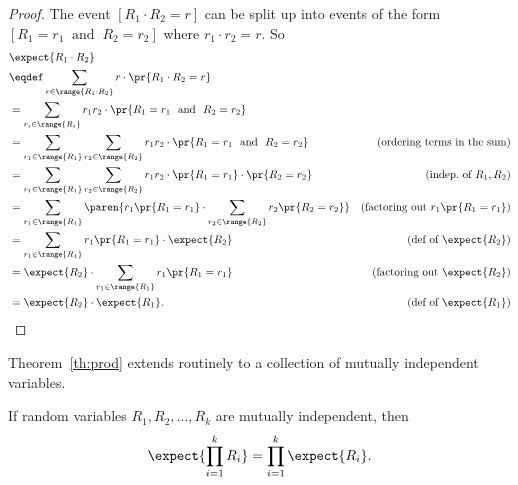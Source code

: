 \begin{proof}
The event $[R_1 \cdot R_2=r]$ can be split up into events of the form
$[R_1 = r_1\ \text{ and }\ R_2 = r_2]$ where $r_1\cdot r_2=r$.  So
\begin{align*}
\lefteqn{\expect{R_1 \cdot R_2}}\\
& \eqdef \sum_{r \in \range{R_1\cdot R_2}} r\cdot \pr{R_1\cdot R_2=r}\\
\iffalse
& =      \sum_{\scriptsize \begin{aligned}
                       r_1 \in \range{R_1},\\
                       r_2 \in \range{R_2}
                      \end{aligned}}\fi
& =      \sum_{r_i \in \range{R_i}}
            r_1 r_2 \cdot \pr{R_1=r_1\ \text{ and }\ R_2=r_2}\\
& =      \sum_{r_1 \in \range{R_1}} \sum_{r_2 \in \range{R_2}}
            r_1 r_2 \cdot \pr{R_1=r_1\ \text{ and }\ R_2=r_2}
                    &\text{(ordering terms in the sum)}\\
& =      \sum_{r_1 \in \range{R_1}} \sum_{r_2 \in \range{R_2}}
            r_1 r_2 \cdot \pr{R_1=r_1}\cdot \pr{R_2=r_2}
                    &\text{(indep.\ of $R_1,R_2$)}\\
& =      \sum_{r_1 \in \range{R_1}} \paren{r_1\pr{R_1=r_1} \cdot
              \sum_{r_2 \in \range{R_2}} r_2 \pr{R_2=r_2}}
                    &\text{(factoring out $r_1\pr{R_1=r_1}$)}\\
& =      \sum_{r_1 \in \range{R_1}} r_1\pr{R_1=r_1} \cdot \expect{R_2}
                    &\text{(def of $\expect{R_2}$)}\\
& =       \expect{R_2} \cdot \sum_{r_1 \in \range{R_1}} r_1\pr{R_1=r_1}
                    &\text{(factoring out $\expect{R_2}$)}\\
& =       \expect{R_2} \cdot  \expect{R_1}.
                    &\text{(def of $\expect{R_1}$)}
\end{align*}

\end{proof}

Theorem~\ref{th:prod} extends routinely to a collection of mutually
independent variables.
\begin{corollary}
If random variables $R_1, R_2, \dots, R_k$ are mutually
independent, then
\[
\expect{\prod_{i=1}^k R_i} = \prod_{i=1}^k \expect{R_i}.
\]
\end{corollary}


\begin{problems}
\classproblems
{}

\homeworkproblems
{}
\end{problems}


\endinput
